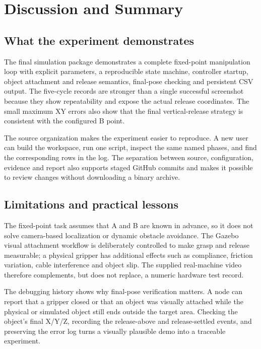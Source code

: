 \documentclass[11pt,a4paper]{article}
\begin{document}
\section{Discussion and Summary}
\subsection{What the experiment demonstrates}
The final simulation package demonstrates a complete fixed-point manipulation loop with explicit parameters, a reproducible state machine, controller startup, object attachment and release semantics, final-pose checking and persistent CSV output. The five-cycle records are stronger than a single successful screenshot because they show repeatability and expose the actual release coordinates. The small maximum XY errors also show that the final vertical-release strategy is consistent with the configured B point.

The source organization makes the experiment easier to reproduce. A new user can build the workspace, run one script, inspect the same named phases, and find the corresponding rows in the log. The separation between source, configuration, evidence and report also supports staged GitHub commits and makes it possible to review changes without downloading a binary archive.

\subsection{Limitations and practical lessons}
The fixed-point task assumes that A and B are known in advance, so it does not solve camera-based localization or dynamic obstacle avoidance. The Gazebo visual attachment workflow is deliberately controlled to make grasp and release measurable; a physical gripper has additional effects such as compliance, friction variation, cable interference and object slip. The supplied real-machine video therefore complements, but does not replace, a numeric hardware test record.

The debugging history shows why final-pose verification matters. A node can report that a gripper closed or that an object was visually attached while the physical or simulated object still ends outside the target area. Checking the object's final X/Y/Z, recording the release-above and release-settled events, and preserving the error log turns a visually plausible demo into a traceable experiment.
\end{document}
